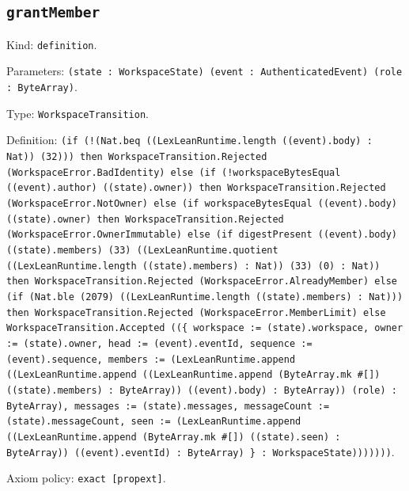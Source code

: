\documentclass[11pt]{article}
\begin{document}
\subsection*{\texttt{grantMember}}
\noindent Kind: \texttt{definition}.\par
\noindent Parameters: \texttt{(state : WorkspaceState) (event : AuthenticatedEvent) (role : ByteArray)}.\par
\noindent Type: \texttt{WorkspaceTransition}.\par
\noindent Definition: \texttt{(if (!(Nat.beq ((LexLeanRuntime.length ((event).body) : Nat)) (32))) then WorkspaceTransition.Rejected (WorkspaceError.BadIdentity) else (if (!workspaceBytesEqual ((event).author) ((state).owner)) then WorkspaceTransition.Rejected (WorkspaceError.NotOwner) else (if workspaceBytesEqual ((event).body) ((state).owner) then WorkspaceTransition.Rejected (WorkspaceError.OwnerImmutable) else (if digestPresent ((event).body) ((state).members) (33) ((LexLeanRuntime.quotient ((LexLeanRuntime.length ((state).members) : Nat)) (33) (0) : Nat)) then WorkspaceTransition.Rejected (WorkspaceError.AlreadyMember) else (if (Nat.ble (2079) ((LexLeanRuntime.length ((state).members) : Nat))) then WorkspaceTransition.Rejected (WorkspaceError.MemberLimit) else WorkspaceTransition.Accepted ((\{ workspace := (state).workspace, owner := (state).owner, head := (event).eventId, sequence := (event).sequence, members := (LexLeanRuntime.append ((LexLeanRuntime.append ((LexLeanRuntime.append (ByteArray.mk \#[]) ((state).members) : ByteArray)) ((event).body) : ByteArray)) (role) : ByteArray), messages := (state).messages, messageCount := (state).messageCount, seen := (LexLeanRuntime.append ((LexLeanRuntime.append (ByteArray.mk \#[]) ((state).seen) : ByteArray)) ((event).eventId) : ByteArray) \} : WorkspaceState)))))))}.\par
\noindent Axiom policy: \texttt{exact [propext]}.\par
\end{document}
